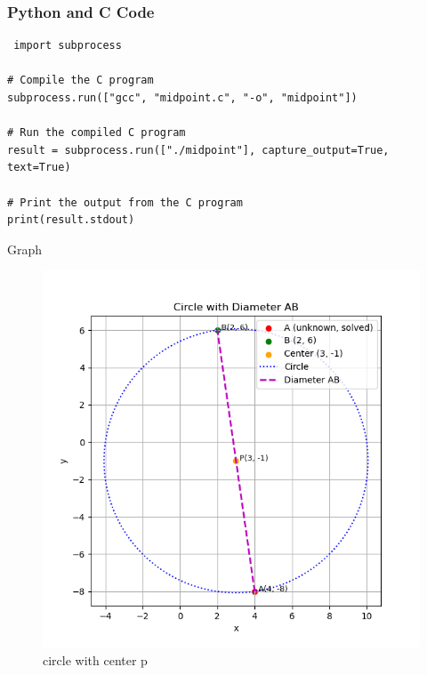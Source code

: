 \documentclass{beamer}
\begin{document}
\begin{frame}[fragile]
\frametitle{Python and C Code}

\begin{lstlisting}
 import subprocess

# Compile the C program
subprocess.run(["gcc", "midpoint.c", "-o", "midpoint"])

# Run the compiled C program
result = subprocess.run(["./midpoint"], capture_output=True, text=True)

# Print the output from the C program 
print(result.stdout)
\end{lstlisting}

\end{frame}

\begin{frame} {Graph}
\begin{figure}[H]
    \centering
 \includegraphics[width=0.5\linewidth]{figs/Fig1.png}
    \caption{circle with center p }
    \label{fig:placeholder}
\end{figure}
\end{frame}
\end{document}

